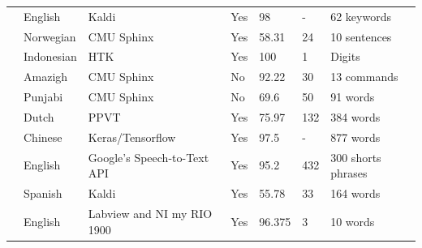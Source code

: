 \begin{landscape}
\begin{table}
\begin{tabular}{ p{5cm} p{3cm} p{4cm} p{2cm} p{2cm} p{2cm} p{4cm}}
&English&Kaldi&Yes&98&-&62 keywords\\
&Norwegian&CMU Sphinx&Yes&58.31&24&10 sentences\\
&Indonesian&HTK&Yes&100&1&Digits\\
&Amazigh&CMU Sphinx&No&92.22&30&13 commands\\
&Punjabi&CMU Sphinx&No&69.6&50&91 words\\
&Dutch&PPVT&Yes&75.97&132&384 words\\
&Chinese&Keras/Tensorflow&Yes&97.5&-&877 words\\
&English&Google's Speech-to-Text API&Yes&95.2&432&300 shorts phrases\\
&Spanish&Kaldi&Yes&55.78&33&164 words\\
&English&Labview and NI my RIO 1900&Yes&96.375&3&10 words\\
 \hline
\end{tabular}
\end{table}
\end{landscape}
